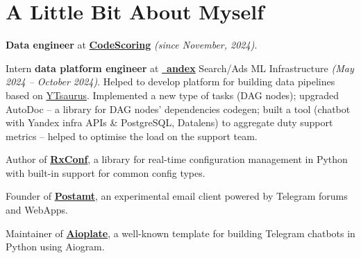 \documentclass[a4paper,11pt]{article}
\newcommand{\MySkip}{
\vskip10pt
}
\begin{document}
\begin{adjustbox}{valign=t}
\begin{minipage}{0.65\textwidth}
\section*{A Little Bit About Myself}
\begin{flushleft}

\textbf{Data engineer} at \textbf{\href{https://codescoring.ru/}{CodeScoring}} \textit{(since November, 2024)}.

\MySkip

Intern \textbf{data platform engineer} at \href{https://ya.ru}{~\hspace{-0.40em}\textbf{andex}} Search/Ads ML Infrastructure \textit{(May 2024 -- October 2024)}. Helped to develop platform for building data pipelines based on \href{https://github.com/ytsaurus/ytsaurus}{YTsaurus}. Implemented a new type of tasks (DAG nodes); upgraded AutoDoc -- a library for DAG nodes' dependencies codegen; built a tool (chatbot with Yandex infra APIs \& PostgreSQL, Datalens) to aggregate duty support metrics -- helped to optimise the load on the support team.

\MySkip

Author of \href{https://realkarych.github.io/rxconf/}{\textbf{RxConf}}, a library for real-time configuration management in Python with built-in support for common config types.

\MySkip

Founder of \hspace{0.3em}\href{https://github.com/realkarych/postamt/}{ \hspace{-0.1em}\textbf{Postamt}}, an experimental email client powered by Telegram forums and WebApps.

\MySkip

Maintainer of \hspace{0.2em}\href{https://github.com/realkarych/aioplate/}{\faGithub\hspace{0.1em}\textbf{Aioplate}}, a well-known template for building Telegram chatbots in Python using Aiogram.


\end{flushleft}
\end{minipage}
\end{adjustbox}
\end{document}
